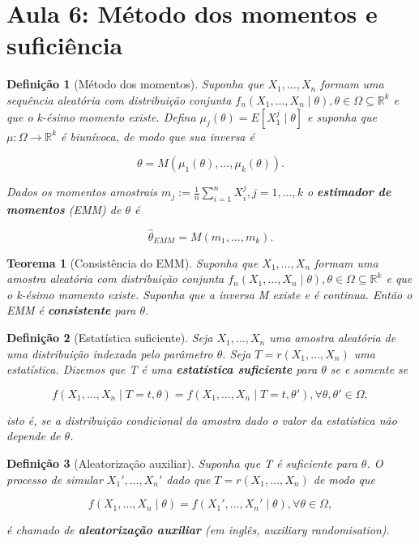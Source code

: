 \documentclass{article}
\newtheorem{theorem}{Teorema}
\newtheorem{definition}{Definição}
\begin{document}
	\section*{Aula 6: Método dos momentos e suficiência}
	\label{s6}
	\begin{definition}[Método dos momentos]
		Suponha que $X_1, \ldots, X_n$ formam uma sequência aleatória com distribuição conjunta $f_n (X_1, \ldots, X_n \mid \theta), \theta \in \Omega \subseteq \mathbb{R}^k$ e que o k-ésimo momento existe. Defina $\mu_j (\theta) = E[X_1^j \mid \theta]$ e suponha que $\mu: \Omega \rightarrow \mathbb{R}^k$ é biunívoca, de modo que sua inversa é
		
		$$\theta = M(\mu_1(\theta), \ldots, \mu_k(\theta)).$$
		
		Dados os momentos amostrais $m_j := \frac{1}{n} \sum_{i=1}^n X_i^j, j = 1, \ldots, k$ o \textbf{estimador de momentos} (EMM) de $\theta$ é
		
		$$\hat{\theta}_{EMM} = M(m_1, \ldots, m_k).$$
	\end{definition}
	
	\begin{theorem}[Consistência do EMM]
		Suponha que $X_1, \ldots, X_n$ formam uma amostra aleatória com distribuição conjunta  $f_n (X_1, \ldots, X_n \mid \theta), \theta \in \Omega \subseteq \mathbb{R}^k$ e que o k-ésimo momento existe. Suponha que a inversa M existe e é continua. Então o EMM é \textbf{consistente} para $\theta$.
	\end{theorem}
	
	\begin{definition}[Estatística suficiente]
		Seja $X_1, \ldots, X_n$ uma amostra aleatória de uma distribuição indexada pelo parâmetro $\theta$. Seja $T = r(X_1, \ldots, X_n)$ uma estatística. Dizemos que T é uma \textbf{estatística suficiente} para $\theta$ se e somente se
		
		\begin{equation}
			f(X_1, \ldots, X_n \mid T = t, \theta) = f(X_1, \ldots, X_n \mid T = t, \theta'), \forall \theta, \theta' \in \Omega,
		\end{equation}
		
		isto é, se a distribuição condicional da amostra dado o valor da estatística não depende de $\theta$.
	\end{definition}
	
	\begin{definition}[Aleatorização auxiliar]
		Suponha que T é suficiente para $\theta$. O processo de simular $X_1', \ldots, X_n'$ dado que $T = r(X_1, \ldots, X_n)$ de modo que 
		
		\begin{equation}
			f(X_1, \ldots, X_n \mid \theta) = f(X_1', \ldots, X_n' \mid \theta), \forall \theta \in \Omega,
		\end{equation}
		
		é chamado de \textbf{aleatorização auxiliar} (em inglês, auxiliary randomisation).
	\end{definition}
	
\end{document}
